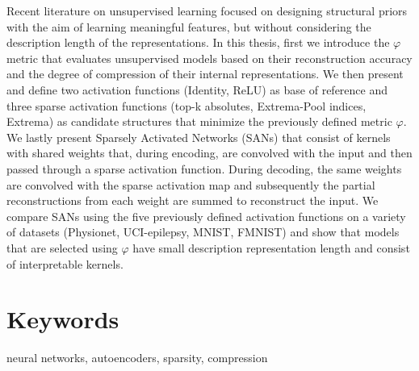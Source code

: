 \begin{abstracteng}
	Recent literature on unsupervised learning focused on designing structural priors with the aim of learning meaningful features, but without considering the description length of the representations.
	In this thesis, first we introduce the $\varphi$ metric that evaluates unsupervised models based on their reconstruction accuracy and the degree of compression of their internal representations.
	We then present and define two activation functions (Identity, ReLU) as base of reference and three sparse activation functions (top-k absolutes, Extrema-Pool indices, Extrema) as candidate structures that minimize the previously defined metric $\varphi$.
	We lastly present Sparsely Activated Networks (SANs) that consist of kernels with shared weights that, during encoding, are convolved with the input and then passed through a sparse activation function.
	During decoding, the same weights are convolved with the sparse activation map and subsequently the partial reconstructions from each weight are summed to reconstruct the input.
	We compare SANs using the five previously defined activation functions on a variety of datasets (Physionet, UCI-epilepsy, MNIST, FMNIST) and show that models that are selected using $\varphi$ have small description representation length and consist of interpretable kernels.

	\section*{Keywords}
	\textlatin{neural networks, autoencoders, sparsity, compression}
\end{abstracteng}
